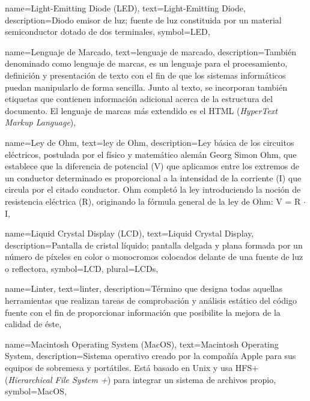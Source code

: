 {
    name={Light-Emitting Diode (LED)},
    text={Light-Emitting Diode},
    description={Diodo emisor de luz; fuente de luz constituida por un material semiconductor dotado de dos terminales},
    symbol={LED},
}

{
    name={Lenguaje de Marcado},
    text={lenguaje de marcado},
    description={También denominado como lenguaje de marcas, es un lenguaje para el procesamiento, definición y presentación de texto con el fin de que los sistemas informáticos puedan manipularlo de forma sencilla. Junto al texto, se incorporan también etiquetas que contienen información adicional acerca de la estructura del documento. El lenguaje de marcas más extendido es el HTML (\textit{HyperText Markup Language})},
}

{
    name={Ley de Ohm},
    text={ley de Ohm},
    description={Ley básica de los circuitos eléctricos, postulada por el físico y matemático alemán Georg Simon Ohm, que establece que la diferencia de potencial (V) que aplicamos entre los extremos de un conductor determinado es proporcional a la intensidad de la corriente (I) que circula por el citado conductor. Ohm completó la ley introduciendo la noción de resistencia eléctrica (R), originando la fórmula general de la ley de Ohm: V = R $\cdot$ I},
}

{
    name={Liquid Crystal Display (LCD)},
    text={Liquid Crystal Display},
    description={Pantalla de cristal líquido; pantalla delgada y plana formada por un número de píxeles en color o monocromos colocados delante de una fuente de luz o reflectora},
    symbol={LCD},
    plural={LCDs},
}

{
    name={Linter},
    text={linter},
    description={Término que designa todas aquellas herramientas que realizan tareas de comprobación y análisis estático del código fuente con el fin de proporcionar información que posibilite la mejora de la calidad de éste},
}

{
    name={Macintosh Operating System (MacOS)},
    text={Macintosh Operating System},
    description={Sistema operativo creado por la compañía Apple para sus equipos de sobremesa y portátiles. Está basado en Unix y usa HFS+ (\textit{Hierarchical File System +}) para integrar un sistema de archivos propio},
    symbol={MacOS},
}

